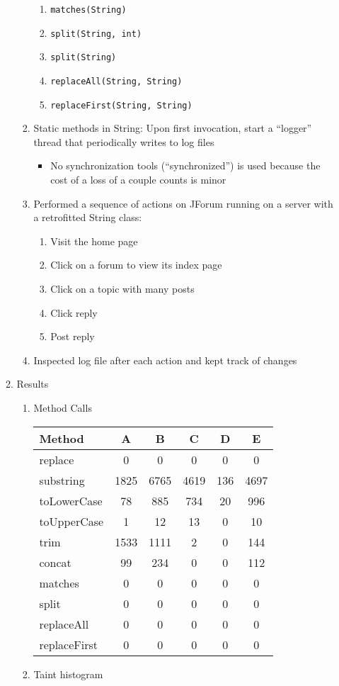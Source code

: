 \documentclass[times,11pt]{article}
\begin{document}
\begin{enumerate}
\begin{enumerate}
\begin{enumerate}
\begin{enumerate}
				\item \texttt{matches(String)}
				\item \texttt{split(String, int)}
				\item \texttt{split(String)}
				\item \texttt{replaceAll(String, String)}
				\item \texttt{replaceFirst(String, String)}
				\end{enumerate}
			\item Static methods in String: Upon first invocation, start a ``logger'' thread that periodically writes to log files
				\begin{itemize}
				\item No synchronization tools (``synchronized'') is used because the cost of a loss of a couple counts is minor
				\end{itemize}
			\item Performed a sequence of actions on JForum running on a server with a retrofitted String class:
				\begin{enumerate}
				\item Visit the home page
				\item Click on a forum to view its index page
				\item Click on a topic with many posts
				\item Click reply
				\item Post reply
				\end{enumerate}
			\item Inspected log file after each action and kept track of changes
			\end{enumerate}
		\item Results
			\begin{enumerate}
			\item Method Calls
			
				\begin{tabular}{l|ccccc} 
				\hline
					\textbf{Method} & \textbf{A} & \textbf{B} & \textbf{C} & \textbf{D} & \textbf{E} \\ 
				\hline
					replace				& 0	& 0	& 0	& 0	& 0 \\
					substring			& 1825	& 6765	& 4619	& 136	& 4697 \\
					toLowerCase		& 78	& 885	& 734	& 20	& 996 \\
					toUpperCase		& 1	& 12	& 13	& 0	& 10 \\
					trim					& 1533	& 1111	& 2	& 0	& 144 \\
					concat				& 99	& 234	& 0	& 0	& 112 \\
					matches				& 0	& 0	& 0	& 0	& 0 \\
					split					& 0	& 0	& 0	& 0	& 0 \\
					replaceAll		& 0	& 0	& 0	& 0	& 0 \\
					replaceFirst	& 0	& 0	& 0	& 0	& 0 \\
				\hline
				\end{tabular} 
			\item Taint histogram
			

\end{enumerate}
\end{enumerate}
\end{enumerate}
\end{document}
